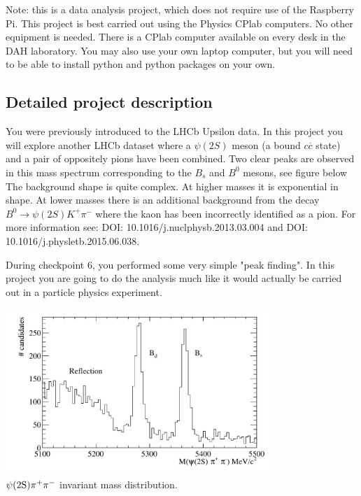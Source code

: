 Note: this is a data analysis project, which does not require use of the Raspberry Pi.
This project is best carried out using the Physics CPlab computers. No other equipment is needed.  There is a CPlab computer available on every desk in the DAH laboratory.
You may also use your own laptop computer, but you will need to be able to install
python and python packages on your own. 


\subsection{Detailed project description}

You were previously introduced to the LHCb Upsilon data. In this
project you will explore another LHCb dataset where a $\psi(2S)$ meson
(a bound $c\overline{c}$ state) and a pair of
oppositely pions have been combined. Two clear
peaks are observed in this mass spectrum corresponding to the $B_s$
and $B^0$ mesons, see figure below %
The background shape is quite
complex. At higher masses it is exponential in shape. At lower masses
there is an additional background from the decay $B^0 \rightarrow
\psi(2S) K^+ \pi^-$ where the kaon has been incorrectly identified as
a pion. For more information see: {DOI: 10.1016/j.nuclphysb.2013.03.004 and DOI: 10.1016/j.physletb.2015.06.038}.


During checkpoint 6, you performed some very simple "peak finding". In this project you are going to do the analysis much like it would actually be carried out in a particle physics experiment.

%
\begin{center}
\includegraphics[width=0.75\textwidth]{figs/psi2Spipi.pdf}\\
{\small $\psi ({\rm 2S}) \pi^{+} \pi^{-}$  invariant mass distribution.}
\end{center}
%


